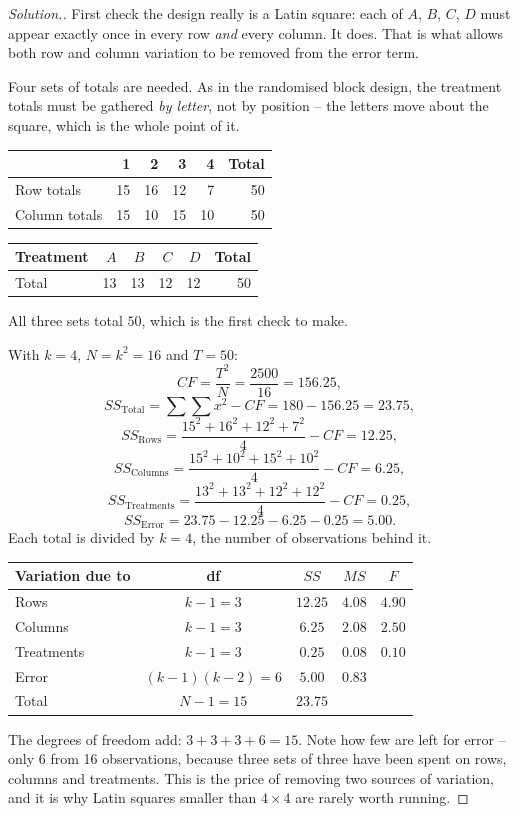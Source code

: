 \documentclass[11pt,a4paper]{article}
\theoremstyle{definition}
\newenvironment{solution}
  {\renewcommand{\qedsymbol}{}\begin{proof}[\textit{Solution}.]}
  {\end{proof}}
\begin{document}
\begin{solution}
First check the design really is a Latin square: each of $A$, $B$, $C$, $D$ must appear
exactly once in every row \emph{and} every column. It does. That is what allows both row
and column variation to be removed from the error term.

Four sets of totals are needed. As in the randomised block design, the treatment totals
must be gathered \emph{by letter}, not by position -- the letters move about the square,
which is the whole point of it.
\begin{table}[H]
\centering
\begin{tabular}{lrrrrr}
            & 1 & 2 & 3 & 4 & Total\\
\hline
Row totals    & 15 & 16 & 12 & 7  & 50\\
Column totals & 15 & 10 & 15 & 10 & 50\\
\end{tabular}
\qquad
\begin{tabular}{lrrrrr}
Treatment & $A$ & $B$ & $C$ & $D$ & Total\\
\hline
Total     & 13 & 13 & 12 & 12 & 50\\
\end{tabular}
\end{table}
All three sets total $50$, which is the first check to make.

With $k=4$, $N=k^2=16$ and $T=50$:
\[CF=\frac{T^2}{N}=\frac{2500}{16}=156.25,\]
\[SS_{\text{Total}}=\sum\sum x^2-CF=180-156.25=23.75,\]
\[SS_{\text{Rows}}=\frac{15^2+16^2+12^2+7^2}{4}-CF=12.25,\]
\[SS_{\text{Columns}}=\frac{15^2+10^2+15^2+10^2}{4}-CF=6.25,\]
\[SS_{\text{Treatments}}=\frac{13^2+13^2+12^2+12^2}{4}-CF=0.25,\]
\[SS_{\text{Error}}=23.75-12.25-6.25-0.25=5.00.\]
Each total is divided by $k=4$, the number of observations behind it.

\begin{table}[H]
\centering
\begin{tabular}{lcccc}
Variation due to & df & $SS$ & $MS$ & $F$\\
\hline
Rows       & $k-1=3$        & $12.25$ & $4.08$ & $4.90$\\
Columns    & $k-1=3$        & $6.25$  & $2.08$ & $2.50$\\
Treatments & $k-1=3$        & $0.25$  & $0.08$ & $0.10$\\
Error      & $(k-1)(k-2)=6$ & $5.00$  & $0.83$ & \\
\hline
Total      & $N-1=15$       & $23.75$ & & \\
\end{tabular}
\end{table}
The degrees of freedom add: $3+3+3+6=15$. Note how few are left for error -- only 6 from 16
observations, because three sets of three have been spent on rows, columns and treatments.
This is the price of removing two sources of variation, and it is why Latin squares smaller
than $4\times 4$ are rarely worth running.


\end{solution}
\end{document}
